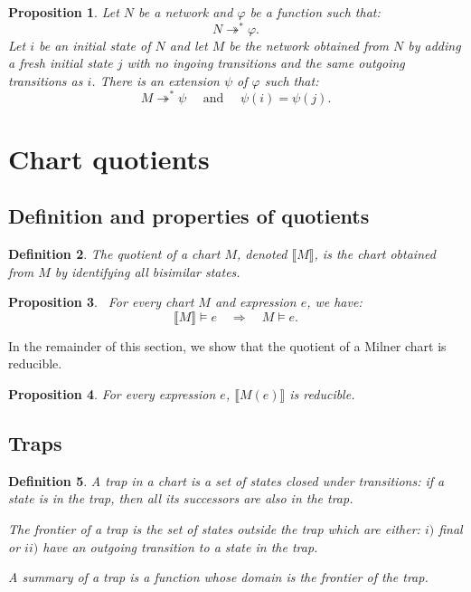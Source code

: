 \documentclass{article}
\newcommand{\quotient}[1]{\llbracket#1\rrbracket}          %
\newtheorem{definition}{Definition}[section]
\newtheorem{proposition}[definition]{Proposition}
\begin{document}
\begin{proposition} Let $N$ be a network and $\varphi$ be a function such that:
  \[N\twoheadrightarrow^* \varphi.\]
  Let $i$ be an initial state of $N$ and let $M$ be the network obtained from $N$ by adding a fresh initial state $j$ with no ingoing transitions and the same outgoing transitions as $i$.  There is an extension $\psi$ of $\varphi$ such that:
  \[  M \twoheadrightarrow^* \psi\quad \text{ and }\quad \psi(i) = \psi(j).\] 
\end{proposition}






\section{Chart quotients}

\subsection{Definition and properties of quotients}
\begin{definition}
  The quotient of a chart $M$, denoted $\quotient{M}$, is the chart obtained from $M$ by identifying all bisimilar states.
\end{definition}

\begin{proposition}~\label{prop:quotient-preserves-labelability} For every chart $M$ and expression $e$, we have:
  \[\quotient{M}\models e\quad \Longrightarrow\quad M\models e.\]
\end{proposition}
In the remainder of this section, we show that the quotient of a Milner chart is reducible.

\begin{proposition}For every expression $e$, $\quotient{M(e)}$ is reducible.~\label{prop:quotient-of-Milner-chart-is-labelable}
\end{proposition}


\subsection{Traps}

\begin{definition} A \emph{trap} in a chart is a set of states closed under transitions: if a state is in the trap, then all its successors are also in the trap.

  The \emph{frontier} of a trap is the set of states outside the trap which are either: $i)$ final or $ii)$ have an outgoing transition to a state in the trap.

  A \emph{summary} of a trap is a function whose domain is the frontier of the trap.
\end{definition}
\end{document}
